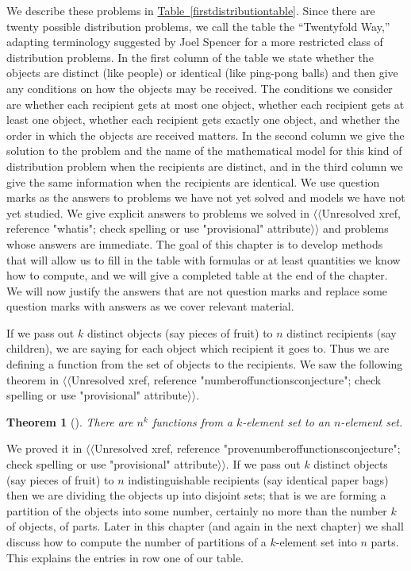 \documentclass[10pt,]{book}
\theoremstyle{plain}
\newtheorem{theorem}{Theorem}[section]
\theoremstyle{definition}
\numberwithin{equation}{chapter}
\begin{document}
We describe these problems in \hyperref[firstdistributiontable]{Table~\ref{firstdistributiontable}}. Since there are twenty possible distribution problems, we call the table the ``Twentyfold Way,'' adapting terminology suggested by Joel Spencer for a more restricted class of distribution problems. In the first column of the table we state whether the objects are distinct (like people) or identical (like ping-pong balls) and then give any conditions on how the objects may be received. The conditions we consider are whether each recipient gets at most one object, whether each recipient gets at least one object, whether each recipient gets exactly one object, and whether the order in which the objects are received matters. In the second column we give the solution to the problem and the name of the mathematical model for this kind of distribution problem when the recipients are distinct, and in the third column we give the same information when the recipients are identical. We use question marks as the answers to problems we have not yet solved and models we have not yet studied. We give explicit answers to problems we solved in {$\langle\langle$Unresolved xref, reference "whatis"; check spelling or use "provisional" attribute$\rangle\rangle$} and problems whose answers are immediate. The goal of this chapter is to develop methods that will allow us to fill in the table with formulas or at least quantities we know how to compute, and we will give a completed table at the end of the chapter. We will now justify the answers that are not question marks and replace some question marks with answers as we cover relevant material.%
\par
If we pass out \(k\) distinct objects (say pieces of fruit) to \(n\) distinct recipients (say children), we are saying for each object which recipient it goes to. Thus we are defining a function from the set of objects to the recipients. We saw the following theorem in {$\langle\langle$Unresolved xref, reference "numberoffunctionsconjecture"; check spelling or use "provisional" attribute$\rangle\rangle$}.%
\begin{theorem}[{}]\label{theorem-2}
There are \(n^k\) functions from a \(k\)-element set to an \(n\)-element set.%
\end{theorem}
We proved it in {$\langle\langle$Unresolved xref, reference "provenumberoffunctionsconjecture"; check spelling or use "provisional" attribute$\rangle\rangle$}. If we pass out \(k\) distinct objects (say pieces of fruit) to \(n\) indistinguishable recipients (say identical paper bags) then we are dividing the objects up into disjoint sets; that is we are forming a partition of the objects into some number, certainly no more than the number \(k\) of objects, of parts. Later in this chapter (and again in the next chapter) we shall discuss how to compute the number of partitions of a \(k\)-element set into \(n\) parts. This explains the entries in row one of our table.%
\end{document}
